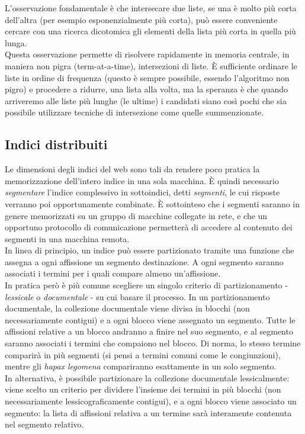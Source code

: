 L'osservazione fondamentale è che intersecare due liste, se una è molto più corta dell'altra (per esempio esponenzialmente più corta), può essere conveniente cercare con una ricerca dicotomica gli elementi della lista più corta in quella più lunga.\\
Questa osservazione permette di risolvere rapidamente in memoria centrale, in maniera non pigra (term-at-a-time), intersezioni di liste. È sufficiente ordinare le liste in ordine di frequenza (questo è sempre possibile, essendo l'algoritmo non pigro) e procedere a ridurre, una lista alla volta, ma la speranza è che quando arriveremo alle liste più lunghe (le ultime) i candidati siano così pochi che sia possibile utilizzare tecniche di intersezione come quelle summenzionate.
\subsection{Indici distribuiti}
Le dimensioni degli indici del web sono tali da rendere poco pratica la memorizzazione dell'intero indice in una sola macchina. È quindi necessario \textit{segmentare} l'indice complessivo in sottoindici, detti \textit{segmenti}, le cui risposte verranno poi opportunamente combinate. È sottointeso che i segmenti saranno in genere memorizzati su un gruppo di macchine collegate in rete, e che un opportuno protocollo di comunicazione permetterà di accedere al contenuto dei segmenti in una macchina remota.\\
In linea di principio, un indice può essere partizionato tramite una funzione che assegna a ogni affissione un segmento destinazione. A ogni segmento saranno associati i termini per i quali compare almeno un'affissione.\\
In pratica però è più comune scegliere un singolo criterio di partizionamento - \textit{lessicale} o \textit{documentale} - su cui basare il processo. In un partizionamento documentale, la collezione documentale viene divisa in blocchi (non necessariamente contigui) e a ogni blocco viene assegnato un segmento. Tutte le affissioni relative a un blocco andranno a finire nel suo segmento, e al segmento saranno associati i termini che compaiono nel blocco. Di norma, lo stesso termine comparirà in più segmenti (si pensi a termini comuni come le congiunzioni), mentre gli \textit{hapax legomena} compariranno esattamente in un solo segmento.\\
In alternativa, è possibile partizionare la collezione documentale lessicalmente: viene scelto un criterio per dividere l'insieme dei termini in più blocchi (non necessariamente lessicograficamente contigui), e a ogni blocco viene associato un segmento: la lista di affissioni relativa a un termine sarà interamente contenuta nel segmento relativo.\\
